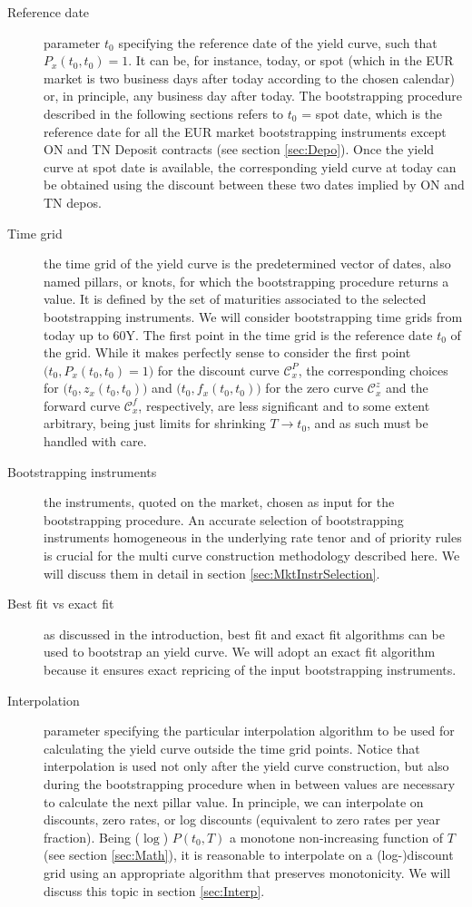 \documentclass[11pt,reqno]{amsart}
\begin{document}
\begin{description}
  \item[Reference date] parameter $t_0$ specifying the reference date of the yield curve, such that $P_x\left(t_0,t_0\right)=1$. It can be, for instance, today, or spot (which in the EUR market is two business days after today according to the chosen calendar) or, in principle, any business day after today. The bootstrapping procedure described in the following sections refers to $t_0$ = spot date, which is the reference date for all the EUR market bootstrapping instruments except ON and TN Deposit contracts (see section \ref{sec:Depo}). Once the yield curve at spot date is available, the corresponding yield curve at today can be obtained using the discount between these two dates implied by ON and TN depos.
  \item[Time grid] the time grid of the yield curve is the predetermined vector of dates, also named pillars, or knots, for which the bootstrapping procedure returns a value. It is defined by the set of maturities associated to the selected bootstrapping instruments. We will consider bootstrapping time grids from today up to 60Y. The first point in the time grid is the reference date $t_0$ of the grid. While it makes perfectly sense to consider the first point $\bigl(t_0,P_x(t_0,t_0)=1\bigr)$ for the discount curve $\mathcal{C}_x^P$, the corresponding choices for $\bigl(t_0,z_x\left(t_0,t_0\right)\bigr)$ and $\bigl(t_0,f_x\left(t_0,t_0\right)\bigr)$ for the zero curve $\mathcal{C}_x^z$ and the forward curve $\mathcal{C}_x^f$, respectively, are less significant and to some extent arbitrary, being just limits for shrinking $T\rightarrow t_0$, and as such must be handled with care.
  \item[Bootstrapping instruments] the instruments, quoted on the market, chosen as input for the bootstrapping procedure. An accurate selection of bootstrapping instruments homogeneous in the underlying rate tenor and of priority rules is crucial for the multi curve construction methodology described here. We will discuss them in detail in section \ref{sec:MktInstrSelection}.
  \item[Best fit vs exact fit] as discussed in the introduction, best fit and exact fit algorithms can be used to bootstrap an yield curve. We will adopt an exact fit algorithm because it ensures exact repricing of the input bootstrapping instruments.
  \item[Interpolation] parameter specifying the particular interpolation algorithm to be used for calculating the yield curve outside the time grid points. Notice that interpolation is used not only after the yield curve construction, but also during the bootstrapping procedure when in between values are necessary to calculate the next pillar value. In principle, we can interpolate on discounts, zero rates, or log discounts (equivalent to zero rates per year fraction). Being ($\log $) $P(t_0,T)$ a monotone non-increasing function of $T$ (see section \ref{sec:Math}), it is reasonable to interpolate on a (log-)discount grid using an appropriate algorithm that preserves monotonicity. We will discuss this topic in section \ref{sec:Interp}.

\end{description}
\end{document}
